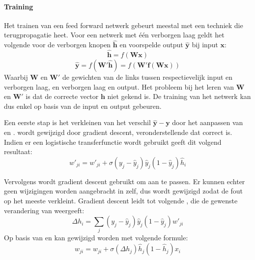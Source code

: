 \paragraph{Training} %
\label{par:training}
Het trainen van een feed forward netwerk gebeurt meestal met een techniek die terugpropagatie heet. Voor een netwerk met \'e\'en verborgen laag geldt het volgende voor de verborgen knopen $\mathbf{\hat{h}}$ en voorspelde output $\mathbf{\hat{y}}$ bij input $\mathbf{x}$: 
\begin{equation}
    \mathbf{\hat{h}} = f(\mathbf{Wx})
\end{equation} 
\begin{equation}
    \mathbf{\hat{y}} = f(\mathbf{W'\hat{h}}) = f(\mathbf{W'f(\mathbf{Wx})})
\end{equation}
Waarbij $\mathbf{W}$ en $\mathbf{W'}$ de gewichten van de links tussen respectievelijk input en verborgen laag, en verborgen laag en output. Het probleem bij het leren van $\mathbf{W}$ en $\mathbf{W'}$ is dat de correcte vector $\mathbf{h}$ niet gekend is. De training van het netwerk kan dus enkel op basis van de input en output gebeuren. 

Een eerste stap is het verkleinen van het verschil $\mathbf{\hat{y}} - \mathbf{y}$ door het aanpassen van  en .  wordt gewijzigd door gradient descent, veronderstellende dat  correct is. Indien er een logistische transferfunctie wordt gebruikt geeft dit volgend resultaat:
\begin{equation}
    w'_{ji} = w'_{ji} + \sigma(y_j-\hat{y}_j)\hat{y}_j(1-\hat{y}_j)\hat{h}_i
\end{equation}

Vervolgens wordt gradient descent gebruikt om  aan te passen. Er kunnen echter geen wijzigingen worden aangebracht in  zelf, dus  wordt gewijzigd zodat de fout op  het meeste verkleint. Gradient descent leidt tot volgende , die de gewenste verandering van  weergeeft:
\begin{equation}
    \Delta h_i = \sum\limits_{j}(y_j-\hat{y}_j)\hat{y}_j(1-\hat{y}_j)w'_{ji}
\end{equation}
Op basis van  en  kan  gewijzigd worden met volgende formule:
\begin{equation}
    w_{ji} = w_{ji} + \sigma(\Delta h_j)\hat{h}_j(1-\hat{h}_j)x_i
\end{equation}

